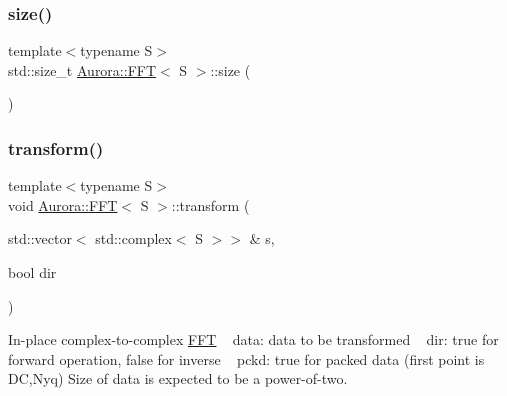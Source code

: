 \mbox{\label{class_aurora_1_1_f_f_t_ad0149c60672d3f4e64850dde22f5b163}} 
\subsubsection{\texorpdfstring{size()}{size()}}
{\footnotesize\ttfamily template$<$typename S$>$ \\
std\+::size\+\_\+t \hyperlink{class_aurora_1_1_f_f_t}{Aurora\+::\+F\+FT}$<$ S $>$\+::size (\begin{DoxyParamCaption}{ }\end{DoxyParamCaption})\hspace{0.3cm}{\ttfamily [inline]}}

\mbox{\label{class_aurora_1_1_f_f_t_a8325de64c8b9f208ed0bc8db3f74e4c7}} 
\subsubsection{\texorpdfstring{transform()}{transform()}\hspace{0.1cm}{\footnotesize\ttfamily [1/3]}}
{\footnotesize\ttfamily template$<$typename S$>$ \\
void \hyperlink{class_aurora_1_1_f_f_t}{Aurora\+::\+F\+FT}$<$ S $>$\+::transform (\begin{DoxyParamCaption}\item[{std\+::vector$<$ std\+::complex$<$ S $>$$>$ \&}]{s,  }\item[{bool}]{dir }\end{DoxyParamCaption})\hspace{0.3cm}{\ttfamily [inline]}}

In-\/place complex-\/to-\/complex \hyperlink{class_aurora_1_1_f_f_t}{F\+FT} ~\newline
data\+: data to be transformed ~\newline
dir\+: true for forward operation, false for inverse ~\newline
pckd\+: true for packed data (first point is DC,Nyq) Size of data is expected to be a power-\/of-\/two. \mbox{\label{class_aurora_1_1_f_f_t_a51ed1e25953c12b7f4cc145d19ee5cd8}} 
